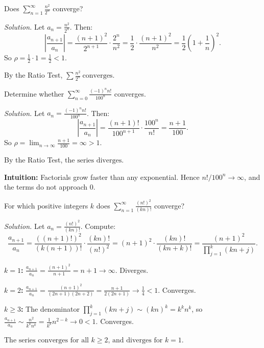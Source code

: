 \begin{examplebox}[title={Worked Example (Lecture Example 5.16): $\sum n^2/2^n$ converges}]
Does $\displaystyle\sum_{n=1}^{\infty}\frac{n^2}{2^n}$ converge?

\emph{Solution.}
Let $a_n=\frac{n^2}{2^n}$. Then:
\[
\left|\frac{a_{n+1}}{a_n}\right|=\frac{(n+1)^2}{2^{n+1}}\cdot\frac{2^n}{n^2}=\frac{1}{2}\cdot\frac{(n+1)^2}{n^2}=\frac{1}{2}\left(1+\frac{1}{n}\right)^2.
\]
So $\rho=\frac{1}{2}\cdot 1=\frac{1}{2}<1$.

By the Ratio Test, $\displaystyle\boxed{\sum\frac{n^2}{2^n}\ \text{converges}}$.
\end{examplebox}

\begin{examplebox}[title={Worked Example (Lecture Example 5.17): $\sum (-1)^n n!/100^n$ diverges}]
Determine whether $\displaystyle\sum_{n=0}^{\infty}\frac{(-1)^n n!}{100^n}$ converges.

\emph{Solution.}
Let $a_n=\frac{(-1)^n n!}{100^n}$. Then:
\[
\left|\frac{a_{n+1}}{a_n}\right|=\frac{(n+1)!}{100^{n+1}}\cdot\frac{100^n}{n!}=\frac{n+1}{100}.
\]
So $\rho=\lim_{n\to\infty}\frac{n+1}{100}=\infty>1$.

By the Ratio Test, $\displaystyle\boxed{\text{the series diverges}}$.

\textbf{Intuition:} Factorials grow faster than any exponential. Hence $n!/100^n\to\infty$, and the terms do not approach $0$.
\end{examplebox}

\begin{examplebox}[title={Worked Example (Tutorial 10, Q2): $\sum (n!)^2/(kn)!$ and parameter $k$}]
For which positive integers $k$ does $\displaystyle\sum_{n=1}^{\infty}\frac{(n!)^2}{(kn)!}$ converge?

\emph{Solution.}
Let $a_n=\frac{(n!)^2}{(kn)!}$. Compute:
\[
\frac{a_{n+1}}{a_n}=\frac{((n+1)!)^2}{(k(n+1))!}\cdot\frac{(kn)!}{(n!)^2}=(n+1)^2\cdot\frac{(kn)!}{(kn+k)!}=\frac{(n+1)^2}{\prod_{j=1}^{k}(kn+j)}.
\]

\textbf{$k=1$:} $\frac{a_{n+1}}{a_n}=\frac{(n+1)^2}{n+1}=n+1\to\infty$. Diverges.

\textbf{$k=2$:} $\frac{a_{n+1}}{a_n}=\frac{(n+1)^2}{(2n+1)(2n+2)}=\frac{n+1}{2(2n+1)}\to\frac{1}{4}<1$. Converges.

\textbf{$k\ge 3$:} The denominator $\prod_{j=1}^{k}(kn+j)\sim (kn)^k=k^k n^k$, so $\frac{a_{n+1}}{a_n}\sim \frac{n^2}{k^k n^k}=\frac{1}{k^k}n^{2-k}\to 0<1$. Converges.

$\boxed{\text{The series converges for all }k\ge 2\text{, and diverges for }k=1.}$
\end{examplebox}

